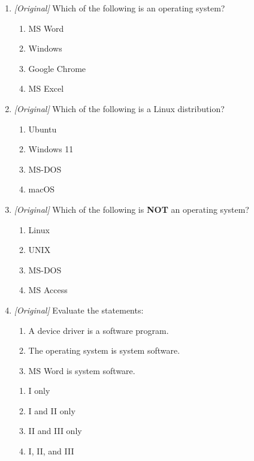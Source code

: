 \documentclass[11pt]{article}
\begin{document}
\begin{enumerate}[label=\textbf{Q\arabic*.}, leftmargin=*]
\begin{enumerate}[label=\Alph*.]
    \item Windows
    \item MS Word
    \item Disk Defragmenter
    \item a device driver
  \end{enumerate}
\item \textit{[Original]} Which of the following is an operating system?
  \begin{enumerate}[label=\Alph*.]
    \item MS Word
    \item Windows
    \item Google Chrome
    \item MS Excel
  \end{enumerate}
\item \textit{[Original]} Which of the following is a Linux distribution?
  \begin{enumerate}[label=\Alph*.]
    \item Ubuntu
    \item Windows 11
    \item MS-DOS
    \item macOS
  \end{enumerate}
\item \textit{[Original]} Which of the following is \textbf{NOT} an operating
  system?
  \begin{enumerate}[label=\Alph*.]
    \item Linux
    \item UNIX
    \item MS-DOS
    \item MS Access
  \end{enumerate}
\item \textit{[Original]} Evaluate the statements:
  \begin{enumerate}[label=\Roman*.]
    \item A device driver is a software program.
    \item The operating system is system software.
    \item MS Word is system software.
  \end{enumerate}
  \begin{enumerate}[label=\Alph*.]
    \item I only
    \item I and II only
    \item II and III only
    \item I, II, and III
  \end{enumerate}

\end{enumerate}
\end{document}
